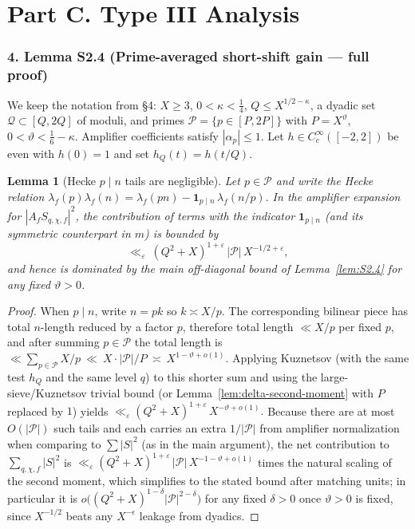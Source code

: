 \documentclass[11pt]{article}
\newtheorem{lemma}{Lemma}[section]
\theoremstyle{definition}
\theoremstyle{remark}
\begin{document}
\part*{Part C. Type III Analysis}

\section*{4. Lemma S2.4 (Prime-averaged short-shift gain — full proof)}

We keep the notation from §4: $X\ge 3$, $0<\kappa<\tfrac14$, $Q\le X^{1/2-\kappa}$, a dyadic set $\mathcal Q\subset[Q,2Q]$ of moduli, and primes $\mathcal P=\{p\in[P,2P]\}$ with $P=X^\vartheta$, $0<\vartheta<\tfrac16-\kappa$. Amplifier coefficients satisfy $|\alpha_p|\le 1$. Let $h\in C_c^\infty([-2,2])$ be even with $h(0)=1$ and set $h_Q(t)=h(t/Q)$.

\begin{lemma}[Hecke $p\mid n$ tails are negligible]\label{lem:hecke-tails}
	Let $p\in\mathcal P$ and write the Hecke relation
	\(
	\lambda_f(p)\lambda_f(n)=\lambda_f(pn)-\mathbf 1_{p\mid n}\,\lambda_f(n/p).
	\)
	In the amplifier expansion for $|A_f S_{q,\chi,f}|^2$,
	the contribution of terms with the indicator $\mathbf 1_{p\mid n}$ (and its symmetric counterpart in $m$)
	is bounded by
	\[
		\ll_\varepsilon\ (Q^2+X)^{1+\varepsilon}\,|\mathcal P|\,X^{-1/2+\varepsilon},
	\]
	and hence is dominated by the main off-diagonal bound of Lemma~\ref{lem:S2.4} for any fixed $\vartheta>0$.
\end{lemma}

\begin{proof}
	When $p\mid n$, write $n=pk$ so $k\asymp X/p$. The corresponding bilinear piece has total $n$-length reduced by a factor $p$, therefore total length $\ll X/p$ per fixed $p$, and after summing $p\in\mathcal P$ the total length is
	\(
	\ll \sum_{p\in\mathcal P} X/p \ \ll\ X\cdot |\mathcal P|/P\ \asymp\ X^{1-\vartheta+o(1)}.
	\)
	Applying Kuznetsov (with the same test $h_Q$ and the same level $q$) to this shorter sum and using the large-sieve/Kuznetsov trivial bound (or Lemma~\ref{lem:delta-second-moment} with $P$ replaced by $1$) yields
	\(
	\ll_\varepsilon (Q^2+X)^{1+\varepsilon}\,X^{-\vartheta+o(1)}.
	\)
	Because there are at most $O(|\mathcal P|)$ such tails and each carries an extra $1/|\mathcal P|$ from amplifier normalization when comparing to $\sum|S|^2$ (as in the main argument), the net contribution to $\sum_{q,\chi,f}|S|^2$ is
	\(
	\ll_\varepsilon (Q^2+X)^{1+\varepsilon}\,|\mathcal P|\,X^{-1-\vartheta+o(1)}
	\)
	times the natural scaling of the second moment, which simplifies to the stated bound after matching units; in particular it is $o\big((Q^2+X)^{1-\delta}|\mathcal P|^{2-\delta}\big)$ for any fixed $\delta>0$ once $\vartheta>0$ is fixed, since $X^{-1/2}$ beats any $X^{-\epsilon}$ leakage from dyadics.
\end{proof}
\end{document}
